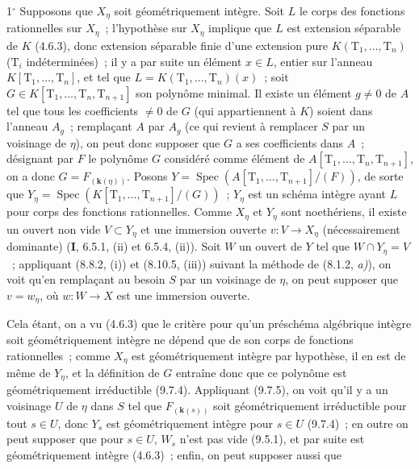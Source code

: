 1$^\circ$ Supposons que $X_\eta$ soit géométriquement intègre. Soit $L$ le corps
des fonctions rationnelles sur $X_\eta$~; l'hypothèse sur $X_\eta$ implique que
$L$ est extension séparable de $K$ (4.6.3), donc extension séparable finie d'une
extension pure $K(\mathrm T_1,\ldots,\mathrm T_n)$ ($\mathrm T_i$
indéterminées)~; il y a par suite un élément $x\in L$, entier sur l'anneau
$K[\mathrm T_1,\ldots,\mathrm T_n]$, et tel que
$L=K(\mathrm T_1,\ldots,\mathrm T_n)(x)$~; soit
$G\in K[\mathrm T_1,\ldots,\mathrm T_n,\mathrm T_{n+1}]$ son polynôme minimal.
Il existe un élément $g\neq0$ de $A$ tel que tous les coefficients $\neq0$ de
$G$ (qui appartiennent à $K$) soient dans l'anneau $A_g$~; remplaçant $A$ par
$A_g$ (ce qui revient à remplacer $S$ par un voisinage de $\eta$), on peut donc
supposer que $G$ a ses coefficients dans $A$~; désignant par $F$ le polynôme
$G$ considéré comme élément de
$A[\mathrm T_1,\ldots,\mathrm T_n,\mathrm T_{n+1}]$, on a donc
$G=F_{(\boldsymbol{k}(\eta))}$. Posons
$Y=\operatorname{Spec}(A[\mathrm T_1,\ldots,\mathrm T_{n+1}]/(F))$, de sorte
que
$Y_\eta=\operatorname{Spec}(K[\mathrm T_1,\ldots,\mathrm T_{n+1}]/(G))$~;
$Y_\eta$ est un schéma intègre ayant $L$ pour corps des fonctions rationnelles.
Comme $X_\eta$ et $Y_\eta$ sont noethériens, il existe un ouvert non vide
$V\subset Y_\eta$ et une immersion ouverte $v:V\to X_\eta$ (nécessairement
dominante) (\textbf{I}, 6.5.1, (ii) et 6.5.4, (ii)). Soit $W$ un ouvert de $Y$
tel que $W\cap Y_\eta=V$~; appliquant (8.8.2, (i)) et (8.10.5, (iii)) suivant
la méthode de (8.1.2, \emph{a)}), on voit qu'en remplaçant au besoin $S$ par un
voisinage de $\eta$, on peut supposer que $v=w_\eta$, où $w:W\to X$ est une
immersion ouverte.

Cela étant, on a vu (4.6.3) que le critère pour qu'un préschéma algébrique
intègre soit géométriquement intègre ne dépend que de son corps de fonctions
rationnelles~; comme $X_\eta$ est géométriquement intègre par hypothèse, il en
est de même de $Y_\eta$, et la définition de $G$ entraîne donc que ce polynôme
est géométriquement irréductible (9.7.4). Appliquant (9.7.5), on voit qu'il y a
un voisinage $U$ de $\eta$ dans $S$ tel que $F_{(\boldsymbol{k}(s))}$ soit
géométriquement irréductible pour tout $s\in U$, donc $Y_s$ est géométriquement
intègre pour $s\in U$ (9.7.4)~; en outre on peut supposer que pour $s\in U$,
$W_s$ n'est pas vide (9.5.1), et par suite est géométriquement intègre (4.6.3)~;
enfin, on peut supposer aussi que

